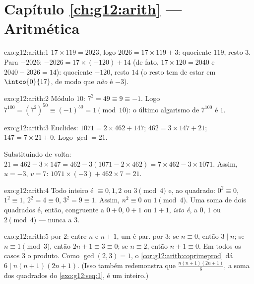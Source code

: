 \section*{Capítulo \ref{ch:g12:arith} --- Aritmética}

\begin{solution}{exo:g12:arith:1}
$17 \times 119 = 2023$, logo $2026 = 17 \times 119 + 3$: quociente $119$,
resto $3$. Para $-2026$: $-2026 = 17\times(-120) + 14$ (de fato,
$17 \times 120 = 2040$ e $2040 - 2026 = 14$): quociente $-120$, resto $14$
(o resto tem de estar em $\intco{0}{17}$, de modo que \emph{não} é $-3$).
\end{solution}

\begin{solution}{exo:g12:arith:2}
Módulo $10$: $7^2 = 49 \equiv 9 \equiv -1$. Logo
$7^{100} = \left(7^2\right)^{50} \equiv (-1)^{50} = 1 \pmod{10}$: o último
algarismo de $7^{100}$ é $1$.
\end{solution}

\begin{solution}{exo:g12:arith:3}
Euclides: $1071 = 2\times462 + 147$; $462 = 3\times147 + 21$;
$147 = 7\times21 + 0$. Logo $\gcd = 21$.

Substituindo de volta: $21 = 462 - 3\times147 = 462 - 3(1071 -
2\times462) = 7\times462 - 3\times1071$. Assim, $u = -3$, $v = 7$:
$1071\times(-3) + 462\times7 = 21$.
\end{solution}

\begin{solution}{exo:g12:arith:4}
Todo inteiro é $\equiv 0, 1, 2$ ou $3 \pmod 4$ e, ao quadrado:
$0^2 \equiv 0$, $1^2 \equiv 1$, $2^2 = 4 \equiv 0$, $3^2 = 9 \equiv 1$.
Assim, $n^2 \equiv 0$ ou $1 \pmod 4$. Uma soma de dois quadrados é, então,
congruente a $0 + 0$, $0 + 1$ ou $1 + 1$, \emph{isto é}, a $0$, $1$ ou
$2 \pmod 4$ --- nunca a $3$.
\end{solution}

\begin{solution}{exo:g12:arith:5}
 por $2$: entre $n$ e $n + 1$, um é par.  por
$3$: se $n \equiv 0$, então $3 \mid n$; se $n \equiv 1 \pmod 3$, então
$2n + 1 \equiv 3 \equiv 0$; se $n \equiv 2$, então $n + 1 \equiv 0$. Em
todos os casos $3$  o produto. Como $\gcd(2,3) = 1$, o
\cref{cor:g12:arith:coprimeprod} dá $6 \mid n(n+1)(2n+1)$. (Isso também
redemonstra que $\frac{n(n+1)(2n+1)}{6}$, a soma dos quadrados do
\cref{exo:g12:seq:1}, é um inteiro.)
\end{solution}

